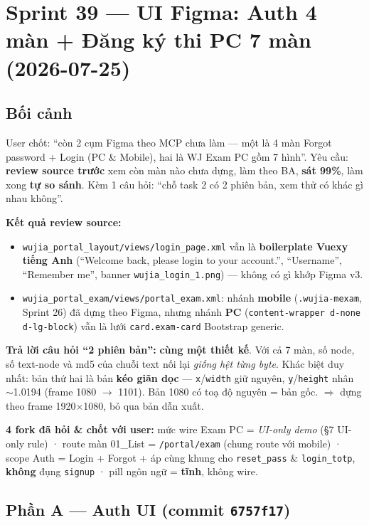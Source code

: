 \chapter{Sprint 39 --- UI Figma: Auth 4 màn + Đăng ký thi PC 7 màn (2026-07-25)}

\section{Bối cảnh}

User chốt: ``còn 2 cụm Figma theo MCP chưa làm --- một là 4 màn Forgot password + Login (PC \& Mobile),
hai là WJ Exam PC gồm 7 hình''. Yêu cầu: \textbf{review source trước} xem còn màn nào chưa dựng, làm theo
BA, \textbf{sát 99\%}, làm xong \textbf{tự so sánh}. Kèm 1 câu hỏi: ``chỗ task 2 có 2 phiên bản, xem thử
có khác gì nhau không''.

\textbf{Kết quả review source:}
\begin{itemize}
  \item \texttt{wujia\_portal\_layout/views/login\_page.xml} vẫn là \textbf{boilerplate Vuexy tiếng Anh}
    (``Welcome back, please login to your account.'', ``Username'', ``Remember me'', banner
    \texttt{wujia\_login\_1.png}) --- không có gì khớp Figma v3.
  \item \texttt{wujia\_portal\_exam/views/portal\_exam.xml}: nhánh \textbf{mobile}
    (\texttt{.wujia-mexam}, Sprint 26) đã dựng theo Figma, nhưng nhánh \textbf{PC}
    (\texttt{content-wrapper d-none d-lg-block}) vẫn là lưới \texttt{card.exam-card} Bootstrap generic.
\end{itemize}

\textbf{Trả lời câu hỏi ``2 phiên bản'':} \textbf{cùng một thiết kế}. Với cả 7 màn, số node, số text-node
và md5 của chuỗi text nối lại \emph{giống hệt từng byte}. Khác biệt duy nhất: bản thứ hai là bản
\textbf{kéo giãn dọc} --- \texttt{x}/\texttt{width} giữ nguyên, \texttt{y}/\texttt{height} nhân $\sim$1.0194
(frame 1080 $\to$ 1101). Bản 1080 có toạ độ nguyên = bản gốc. $\Rightarrow$ dựng theo frame 1920$\times$1080,
bỏ qua bản dẫn xuất.

\textbf{4 fork đã hỏi \& chốt với user:} mức wire Exam PC = \emph{UI-only demo} (§7 UI-only rule) ·
route màn 01\_List = \texttt{/portal/exam} (chung route với mobile) · scope Auth = Login + Forgot + áp
cùng khung cho \texttt{reset\_pass} \& \texttt{login\_totp}, \textbf{không} đụng \texttt{signup} ·
pill ngôn ngữ = \textbf{tĩnh}, không wire.

\section{Phần A --- Auth UI (commit \texttt{6757f17})}

